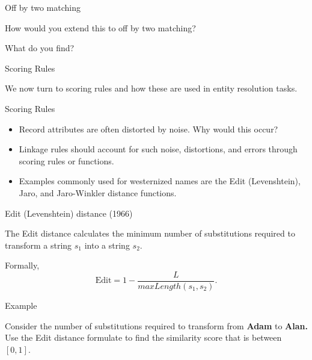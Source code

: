\documentclass[
  ignorenonframetext,
]{beamer}
\begin{document}
\begin{frame}{Off by two matching}
\protect\hypertarget{off-by-two-matching}{}

How would you extend this to off by two matching?

What do you find?

\end{frame}

\begin{frame}{Scoring Rules}
\protect\hypertarget{scoring-rules}{}

We now turn to scoring rules and how these are used in entity resolution
tasks.

\end{frame}

\begin{frame}{Scoring Rules}
\protect\hypertarget{scoring-rules-1}{}

\begin{itemize}
\item
  Record attributes are often distorted by noise. Why would this occur?
\item
  Linkage rules should account for such noise, distortions, and errors
  through scoring rules or functions.
\item
  Examples commonly used for westernized names are the Edit
  (Levenshtein), Jaro, and Jaro-Winkler distance functions.
\end{itemize}

\end{frame}

\begin{frame}{Edit (Levenshtein) distance (1966)}
\protect\hypertarget{edit-levenshtein-distance-1966}{}

The Edit distance calculates the minimum number of substitutions
required to transform a string \(s_1\) into a string \(s_2.\)

Formally, \[\text{Edit} = 1-\frac{L}{maxLength(s_1, s_2)}.\]

\end{frame}

\begin{frame}{Example}
\protect\hypertarget{example}{}

Consider the number of substitutions required to transform from
\textbf{Adam} to \textbf{Alan.} Use the Edit distance formulate to find
the similarity score that is between \([0,1].\)

\end{frame}
\end{document}
